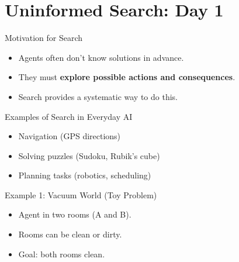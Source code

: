 \documentclass[aspectratio=169]{beamer}
\begin{document}
\begin{frame}
  \titlepage
\end{frame}




\section{Uninformed Search: Day 1}

\begin{frame}{Motivation for Search}
  \begin{itemize}
    \item Agents often don’t know solutions in advance.
    \item They must \textbf{explore possible actions and consequences}.
    \item Search provides a systematic way to do this.
  \end{itemize}
  \vspace{0.3cm}
  \begin{center}
  \end{center}
\end{frame}

\begin{frame}{Examples of Search in Everyday AI}
  \begin{itemize}
    \item Navigation (GPS directions)
    \item Solving puzzles (Sudoku, Rubik’s cube)
    \item Planning tasks (robotics, scheduling)
  \end{itemize}
\end{frame}

\begin{frame}{Example 1: Vacuum World (Toy Problem)}
  \begin{minipage}{0.55\textwidth}
    \begin{itemize}
      \item Agent in two rooms (A and B).
      \item Rooms can be clean or dirty.
      \item Goal: both rooms clean.
    \end{itemize}
  \end{minipage}%
  \begin{minipage}{0.43\textwidth}
  \end{minipage}
\end{frame}
\end{document}
